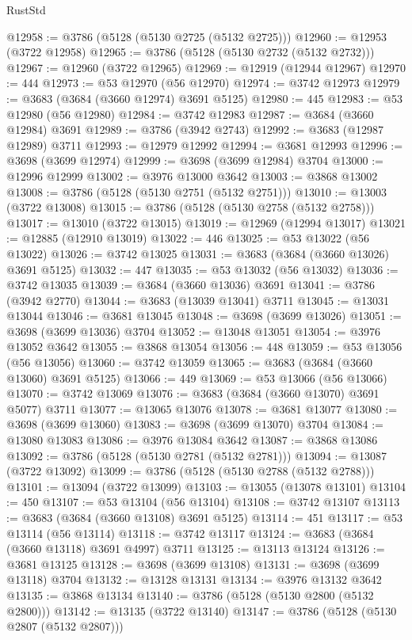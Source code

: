 \begin{lexlean}{RustStd}
\begin{coremodule}
@12958 := @3786 (@5128 (@5130 @2725 (@5132 @2725)))
@12960 := @12953 (@3722 @12958)
@12965 := @3786 (@5128 (@5130 @2732 (@5132 @2732)))
@12967 := @12960 (@3722 @12965)
@12969 := @12919 (@12944 @12967)
@12970 := 444
@12973 := @53 @12970 (@56 @12970)
@12974 := @3742 @12973
@12979 := @3683 (@3684 (@3660 @12974) @3691 @5125)
@12980 := 445
@12983 := @53 @12980 (@56 @12980)
@12984 := @3742 @12983
@12987 := @3684 (@3660 @12984) @3691
@12989 := @3786 (@3942 @2743)
@12992 := @3683 (@12987 @12989) @3711
@12993 := @12979 @12992
@12994 := @3681 @12993
@12996 := @3698 (@3699 @12974)
@12999 := @3698 (@3699 @12984) @3704
@13000 := @12996 @12999
@13002 := @3976 @13000 @3642
@13003 := @3868 @13002
@13008 := @3786 (@5128 (@5130 @2751 (@5132 @2751)))
@13010 := @13003 (@3722 @13008)
@13015 := @3786 (@5128 (@5130 @2758 (@5132 @2758)))
@13017 := @13010 (@3722 @13015)
@13019 := @12969 (@12994 @13017)
@13021 := @12885 (@12910 @13019)
@13022 := 446
@13025 := @53 @13022 (@56 @13022)
@13026 := @3742 @13025
@13031 := @3683 (@3684 (@3660 @13026) @3691 @5125)
@13032 := 447
@13035 := @53 @13032 (@56 @13032)
@13036 := @3742 @13035
@13039 := @3684 (@3660 @13036) @3691
@13041 := @3786 (@3942 @2770)
@13044 := @3683 (@13039 @13041) @3711
@13045 := @13031 @13044
@13046 := @3681 @13045
@13048 := @3698 (@3699 @13026)
@13051 := @3698 (@3699 @13036) @3704
@13052 := @13048 @13051
@13054 := @3976 @13052 @3642
@13055 := @3868 @13054
@13056 := 448
@13059 := @53 @13056 (@56 @13056)
@13060 := @3742 @13059
@13065 := @3683 (@3684 (@3660 @13060) @3691 @5125)
@13066 := 449
@13069 := @53 @13066 (@56 @13066)
@13070 := @3742 @13069
@13076 := @3683 (@3684 (@3660 @13070) @3691 @5077) @3711
@13077 := @13065 @13076
@13078 := @3681 @13077
@13080 := @3698 (@3699 @13060)
@13083 := @3698 (@3699 @13070) @3704
@13084 := @13080 @13083
@13086 := @3976 @13084 @3642
@13087 := @3868 @13086
@13092 := @3786 (@5128 (@5130 @2781 (@5132 @2781)))
@13094 := @13087 (@3722 @13092)
@13099 := @3786 (@5128 (@5130 @2788 (@5132 @2788)))
@13101 := @13094 (@3722 @13099)
@13103 := @13055 (@13078 @13101)
@13104 := 450
@13107 := @53 @13104 (@56 @13104)
@13108 := @3742 @13107
@13113 := @3683 (@3684 (@3660 @13108) @3691 @5125)
@13114 := 451
@13117 := @53 @13114 (@56 @13114)
@13118 := @3742 @13117
@13124 := @3683 (@3684 (@3660 @13118) @3691 @4997) @3711
@13125 := @13113 @13124
@13126 := @3681 @13125
@13128 := @3698 (@3699 @13108)
@13131 := @3698 (@3699 @13118) @3704
@13132 := @13128 @13131
@13134 := @3976 @13132 @3642
@13135 := @3868 @13134
@13140 := @3786 (@5128 (@5130 @2800 (@5132 @2800)))
@13142 := @13135 (@3722 @13140)
@13147 := @3786 (@5128 (@5130 @2807 (@5132 @2807)))

\end{coremodule}
\end{lexlean}
